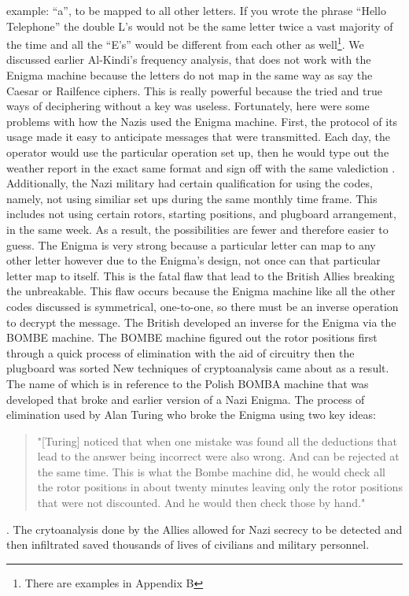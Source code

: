 \documentclass[12pt,letterpaper]{article} %
\begin{document}
example: “a”, to be mapped to all other letters.  If you wrote the phrase “Hello Telephone” the double L’s would not be the same letter twice a vast majority of the time and 
all the “E’s” would be different from each other as well\footnote{There are examples in Appendix B}.  We discussed earlier Al-Kindi’s frequency analysis, that does not work with the Enigma machine because the letters 
do not map in the same way as say the Caesar or Railfence ciphers.  This is really powerful because the tried and true ways of deciphering without a key was useless.
Fortunately, here were some problems with how the Nazis used the Enigma machine.  First, the protocol of its usage made it easy to anticipate messages that were transmitted. Each day, the operator would use the particular operation set up, then he would type out the weather report in the exact same format and sign off with the same valediction \cite{USW}.  Additionally, the Nazi military had certain qualification for using the codes, namely, not using similiar set ups during the same monthly time frame.  This includes not using certain rotors, starting positions, and plugboard arrangement, in the same week\cite{Haran1}. As a result, the possibilities are fewer and therefore easier to guess. The Enigma is very strong because a particular letter can map to any other letter however due to the Enigma’s
 design, not once can that particular letter map to itself.  This is the fatal flaw that lead to the British Allies breaking the unbreakable.  This flaw occurs 
because the Enigma machine like all the other codes discussed is symmetrical, one-to-one, so there must be an inverse operation to decrypt the message. 
The British developed an inverse for the Enigma via the BOMBE machine. The BOMBE machine figured out the rotor positions first through a quick process of elimination with the aid of circuitry then the plugboard was sorted \cite{USW} New techniques of cryptoanalysis came about as a result. The name of which is in reference to the Polish BOMBA machine that was developed that broke and earlier version of a Nazi Enigma.  The process of elimination used by Alan Turing who broke the Enigma using two key ideas: \begin{quote}{"[Turing] noticed that when one mistake was found all the deductions that lead to the answer being incorrect were also wrong. And can be rejected at the same time.
This is what the Bombe machine did, he would check all the rotor positions in about twenty minutes leaving only the rotor positions that were not discounted.  And he would 
then check those by hand."}\end{quote} \cite{Haran2}.  The crytoanalysis done by the Allies allowed for Nazi secrecy to be detected and then infiltrated saved thousands of lives of civilians and military personnel.
\end{document}

